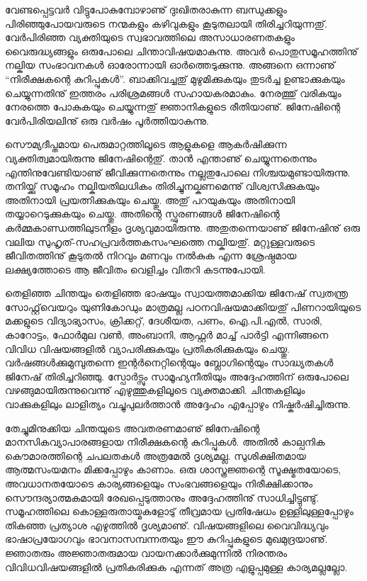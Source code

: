 \newpage
{}
വേണ്ടപ്പെട്ടവര്‍ വിട്ടുപോകുമ്പോഴാണു് ദുഃഖിതരാകുന്ന ബന്ധുക്കളും പിരിഞ്ഞുപോയവരുടെ നന്മകളും
കഴിവുകളും കൂടുതലായി തിരിച്ചറിയുന്നതു്. വേര്‍പിരിഞ്ഞ വ്യക്തിയുടെ സ്വഭാവത്തിലെ അസാധാരണതകളും വൈരുദ്ധ്യങ്ങളും ഒരുപോലെ
ചിന്താവിഷയമാകുന്നു. അവര്‍ പൊതുസമൂഹത്തിനു് നല്കിയ സംഭാവനകള്‍ ഓരോന്നായി ഓര്‍ത്തെടുക്കുന്നു. അങ്ങനെ ഒന്നാണു്
``നിരീക്ഷകന്റെ കുറിപ്പുകള്‍''. ബാക്കിവച്ചതു് മുഴുമിക്കുകയും തുടര്‍ച്ച ഉണ്ടാക്കുകയും ചെയ്യുന്നതിനു് ഇത്തരം പരിശ്രമങ്ങള്‍ സഹായകരമാകും.
നേരത്തു് വരികയും നേരത്തെ പോകുകയും ചെയ്യുന്നതു് ജ്ഞാനികളുടെ രീതിയാണു്. ജിനേഷിന്റെ വേര്‍പിരിയലിനു് ഒരു വര്‍ഷം പൂര്‍ത്തിയാകുന്നു.

സൌമ്യദീപ്തമായ പെരുമാറ്റത്തിലൂടെ ആളുകളെ ആകര്‍ഷിക്കുന്ന വ്യക്തിത്വമായിരുന്നു ജിനേഷിന്റെതു്. താന്‍ എന്താണു് ചെയ്യുന്നതെന്നും
എന്തിനുവേണ്ടിയാണു് ജീവിക്കുന്നതെന്നും നല്ലതുപോലെ നിശ്ചയമുണ്ടായിരുന്നു. തനിയ്ക്കു് സമൂഹം നല്കിയതിലധികം തിരിച്ചുനല്കണമെന്നു്
വിശ്വസിക്കുകയും അതിനായി പ്രയത്നിക്കുകയും ചെയ്തു. അതു് പറയുകയും അതിനായി തയ്യാറെടുക്കുകയും ചെയ്തു. അതിന്റെ സ്ഫുരണങ്ങള്‍
ജിനേഷിന്റെ കര്‍മ്മകാണ്ഡത്തിലുടനീളം ദൃശ്യവുമായിരുന്നു. അതുതന്നെയാണു് ജിനേഷിനു് ഒരു വലിയ സുഹൃത്-സഹപ്രവര്‍ത്തകസംഘത്തെ
നല്കിയതു്. മറ്റുള്ളവരുടെ ജീവിതത്തിനു് കൂടുതല്‍ നിറവും മണവും നല്‍കുക എന്ന ശ്രേഷ്ഠമായ ലക്ഷ്യത്തോടെ ആ ജീവിതം വെളിച്ചം വിതറി കടന്നുപോയി.

തെളിഞ്ഞ ചിന്തയും തെളിഞ്ഞ ഭാഷയും സ്വായത്തമാക്കിയ ജിനേഷ് സ്വതന്ത്ര സോഫ്റ്റ്‌വെയറും യുണികോഡും മാത്രമല്ല പഠനവിഷയമാക്കിയതു് 
പിണറായിയുടെ മക്കളുടെ വിദ്യാഭ്യാസം, ക്രിക്കറ്റ്, ദേശീയത, പണം, ഐ.പി.എല്‍, സാരി, കാറോട്ടം, ഫോര്‍മുല വണ്‍, അംബാനി, ആഫ്റ്റര്‍ 
മാച്ച് പാര്‍ട്ടി എന്നിങ്ങനെ വിവിധ വിഷയങ്ങളില്‍ വ്യാപരിക്കുകയും പ്രതികരിക്കുകയും ചെയ്തു. വര്‍ഷങ്ങള്‍ക്കുമുമ്പുതന്നെ ഇന്റര്‍നെറ്റിന്റെയും 
ബ്ലോഗിന്റെയും സാദ്ധ്യതകള്‍ ജിനേഷ് തിരിച്ചറിഞ്ഞു.  സ്പോര്‍ട്സും സാമൂഹ്യനീതിയും അദ്ദേഹത്തിന് ഒരുപോലെ വഴങ്ങുമായിരുന്നുവെന്നു് 
എഴുത്തുകളിലൂടെ വ്യക്തമാക്കി. ചിന്തകളിലും വാക്കുകളിലും ലാളിത്യം വച്ചുപുലര്‍ത്താന്‍ അദ്ദേഹം എപ്പോഴും നിഷ്കര്‍ഷിച്ചിരുന്നു. 

തേച്ചുമിനുക്കിയ ചിന്തയുടെ അവതരണമാണു് ജിനേഷിന്റെ മാനസികവ്യാപാരങ്ങളായ നിരീക്ഷകന്റെ കുറിപ്പുകള്‍. അതില്‍ കാല്പനിക കൌമാരത്തിന്റെ 
ചപലതകള്‍ അത്രമേല്‍ ദൃശ്യമല്ല. സുശിക്ഷിതമായ ആത്മസംയമനം മിക്കപ്പോഴും കാണാം. ഒരു ശാസ്ത്രജ്ഞന്റെ സൂക്ഷ്മതയോടെ, അവധാനതയോടെ 
കാര്യങ്ങളെയും സംഭവങ്ങളെയും നിരീക്ഷിക്കാനും സൌന്ദര്യാത്മകമായി രേഖപ്പെടുത്താനും അദ്ദേഹത്തിനു് സാധിച്ചിട്ടുണ്ടു്. സമൂഹത്തിലെ 
കൊള്ളരുതായ്മകളോടു് തീവ്രമായ പ്രതിഷേധം ഉള്ളിലുള്ളപ്പോഴും തികഞ്ഞ പ്രത്യാശ എഴുത്തില്‍ ദൃശ്യമാണു്. വിഷയങ്ങളിലെ വൈവിദ്ധ്യവും 
ഭാഷാപ്രയോഗവും ഭാവനാസമ്പന്നതയും ഈ കുറിപ്പുകളുടെ മുഖമുദ്രയാണു്. ജ്ഞാതരും അജ്ഞാതരുമായ വായനക്കാര്‍ക്കുമുന്നില്‍ നിരന്തരം 
വിവിധവിഷയങ്ങളില്‍ പ്രതികരിക്കുക എന്നത് അത്ര എളുപ്പമുള്ള കാര്യമല്ലല്ലോ.

